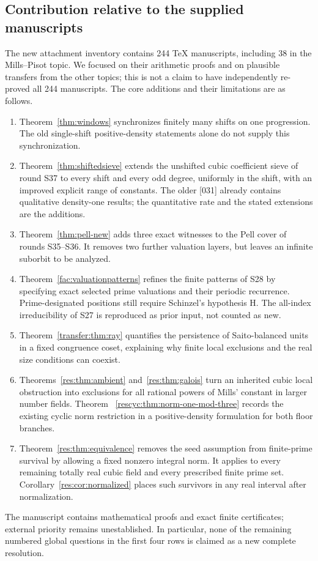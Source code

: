 \documentclass[11pt,a4paper]{article}
\theoremstyle{remark}\newtheorem{remark}[theorem]{Remark}
\begin{document}
\subsection{Contribution relative to the supplied manuscripts}
The new attachment inventory contains 244 TeX manuscripts, including
38 in the Mills--Pisot topic. We focused on their arithmetic proofs
and on plausible transfers from the other topics; this is not a
claim to have independently re-proved all 244 manuscripts.
The core additions and their limitations are as follows.
\begin{enumerate}
\item Theorem~\ref{thm:windows} synchronizes finitely many shifts on
one progression. The old single-shift positive-density statements
alone do not supply this synchronization.
\item Theorem~\ref{thm:shiftedsieve} extends the unshifted cubic
coefficient sieve of round S37 to every shift and every odd degree,
uniformly in the shift, with an improved explicit range of constants.
The older [031] already contains qualitative density-one results;
the quantitative rate and the stated extensions are the additions.
\item Theorem~\ref{thm:pell-new} adds three exact witnesses to the
Pell cover of rounds S35--S36. It removes two further valuation
layers, but leaves an infinite suborbit to be analyzed.
\item Theorem~\ref{fac:valuationpatterns} refines the finite patterns
of S28 by specifying exact selected prime valuations and their
periodic recurrence. Prime-designated positions still require
Schinzel's hypothesis H. The all-index irreducibility of S27 is
reproduced as prior input, not counted as new.
\item Theorem~\ref{transfer:thm:ray} quantifies the persistence of
Saito-balanced units in a fixed congruence coset, explaining why
finite local exclusions and the real size conditions can coexist.
\item Theorems~\ref{res:thm:ambient} and~\ref{res:thm:galois} turn
an inherited cubic local obstruction into exclusions for all rational
powers of Mills' constant in larger number fields. Theorem~
\ref{rescyc:thm:norm-one-mod-three} records the existing cyclic
norm restriction in a positive-density formulation for both floor branches.
\item Theorem~\ref{res:thm:equivalence} removes the seed assumption
from finite-prime survival by allowing a fixed nonzero integral norm.
It applies to every remaining totally real cubic field and every
prescribed finite prime set. Corollary~\ref{res:cor:normalized}
places such survivors in any real interval after normalization.
\end{enumerate}
The manuscript contains mathematical proofs and exact finite
certificates; external priority remains unestablished. In particular,
none of the remaining numbered global questions in the first four
rows is claimed as a new complete resolution.
\end{document}
